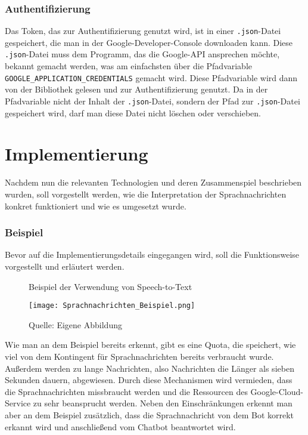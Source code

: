 \subsubsection{Authentifizierung}
Das Token, das zur Authentifizierung genutzt wird, ist in einer \texttt{.json}-Datei gespeichert, die man in der Google-Developer-Console downloaden kann. Diese \texttt{.json}-Datei muss dem Programm, das die Google-API ansprechen möchte, bekannt gemacht werden, was am einfachsten über die Pfadvariable \texttt{GOOGLE\_APPLICATION\_CREDENTIALS} gemacht wird. Diese Pfadvariable wird dann von der Bibliothek gelesen und zur Authentifizierung genutzt. Da in der Pfadvariable nicht der Inhalt der \texttt{.json}-Datei, sondern der Pfad zur \texttt{.json}-Datei gespeichert wird, darf man diese Datei nicht löschen oder verschieben.

\section{Implementierung}
Nachdem nun die relevanten Technologien und deren Zusammenspiel beschrieben wurden, soll vorgestellt werden, wie die Interpretation der Sprachnachrichten konkret funktioniert und wie es umgesetzt wurde.

\subsubsection{Beispiel}
Bevor auf die Implementierungsdetails eingegangen wird, soll die Funktionsweise vorgestellt und erläutert werden.

\begin{figure}[!htb]
    \centering
    \caption{Beispiel der Verwendung von Speech-to-Text}
      \texttt{[image: Sprachnachrichten\_Beispiel.png]}
      \label{img:speekExample}
    \caption*{Quelle: Eigene Abbildung}
\end{figure}

Wie man an dem Beispiel bereits erkennt, gibt es eine Quota, die speichert, wie viel von dem Kontingent für Sprachnachrichten bereits verbraucht wurde. Außerdem werden zu lange Nachrichten, also Nachrichten die Länger als sieben Sekunden dauern, abgewiesen. Durch diese Mechanismen wird vermieden, dass die Sprachnachrichten missbraucht werden und die Ressourcen des Google-Cloud-Service zu sehr beansprucht werden.
Neben den Einschränkungen erkennt man aber an dem Beispiel zusätzlich, dass die Sprachnachricht von dem Bot korrekt erkannt wird und anschließend vom Chatbot beantwortet wird.

